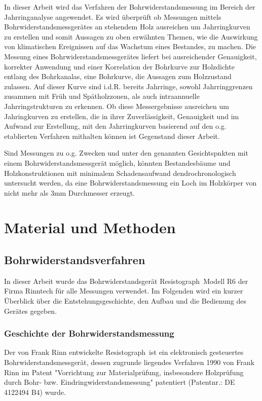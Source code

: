 \documentclass[a4paper, halfparskip]{article}
\def\SymbReg{\textsuperscript{\textregistered}}
\begin{document}
In dieser Arbeit wird das Verfahren der Bohrwiderstandsmessung im Bereich der
Jahrringanalyse angewendet. Es wird überprüft ob Messungen mittels
Bohrwiderstandsmessgerätes an stehendem Holz ausreichen um Jahrringkurven zu
erstellen und somit Aussagen zu oben erwähnten Themen, wie die Auswirkung von
klimatischen Ereignissen auf das Wachstum eines Bestandes, zu machen. Die
Messung eines Bohrwiderstandsmessgerätes liefert bei ausreichender
Genauigkeit, korrekter Anwendung und einer Korrelation der Bohrkurve zur
Holzdichte entlang des Bohrkanalas, eine Bohrkurve, die Aussagen zum
Holzzustand zulassen. Auf dieser Kurve sind i.d.R. bereits Jahrringe, sowohl
Jahrringgrenzen zusammen mit Früh und Spätholzzonen, als auch intraannuelle
Jahrringstrukturen zu erkennen. Ob diese Messergebnisse ausreichen um
Jahringkurven zu erstellen, die in ihrer Zuverlässigkeit, Genauigkeit und im
Aufwand zur Erstellung, mit den Jahrringkurven basierend auf den o.g.
etablierten Verfahren mithalten können ist Gegenstand dieser Arbeit.

Sind Messungen zu o.g. Zwecken und unter den genannten Gesichtspnkten mit
einem Bohrwiderstandsmessgerät möglich, könnten Bestandesbäume und
Holzkonstruktionen mit minimalem Schadensaufwand dendrochronologisch
untersucht werden, da eine Bohrwiderstandsmessung ein Loch im Holzkörper von
nicht mehr als 3mm Durchmesser erzeugt.

\section{Material und Methoden}\label{sec:material}
\subsection{Bohrwiderstandsverfahren}\label{subsec:bohrwiderstandsverfahren}
In dieser Arbeit wurde das Bohrwiderstandsgerät Resistograph\SymbReg\ Modell
R6 der Firma Rinntech für alle Messungen verwendet. Im Folgenden wird ein
kurzer Überblick über die Entstehungsgeschichte, den Aufbau und die Bedienung
des Gerätes gegeben.
\subsubsection{Geschichte der
Bohrwiderstandsmessung}\label{subsubsec:geschichte_bwm}

Der von Frank Rinn entwickelte Resistograph\SymbReg\ ist ein elektronisch
gesteuertes Bohrwiderstandsmessgerät, dessen zugrunde liegendes Verfahren 1990
von Frank Rinn im Patent "Vorrichtung zur Materialprüfung, insbesondere
Holzprüfung durch Bohr- bzw. Eindringwiderstandsmessung"{} patentiert
(Patentnr.: DE 4122494 B4) wurde.
\end{document}
